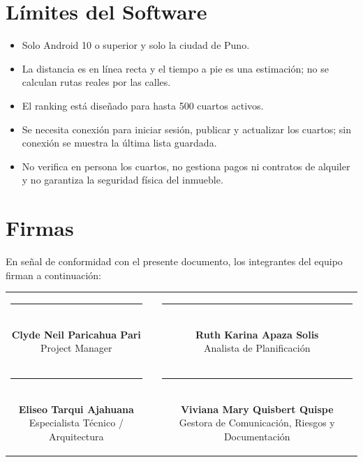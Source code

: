 \documentclass[11pt,a4paper]{article}
\begin{document}
\section{Límites del Software}
\begin{itemize}[leftmargin=*]
    \item Solo Android 10 o superior y solo la ciudad de Puno.
    \item La distancia es en línea recta y el tiempo a pie es una estimación; no se calculan rutas reales por las calles.
    \item El ranking está diseñado para hasta 500 cuartos activos.
    \item Se necesita conexión para iniciar sesión, publicar y actualizar los cuartos; sin conexión se muestra la última lista guardada.
    \item No verifica en persona los cuartos, no gestiona pagos ni contratos de alquiler y no garantiza la seguridad física del inmueble.
\end{itemize}

\section{Firmas}
\noindent En señal de conformidad con el presente documento, los integrantes del equipo firman a continuación:

\vspace{1.5cm}
\begin{center}
\begin{tabular}{c c c}
    \parbox{6.5cm}{\centering \rule{6.0cm}{0.6pt}\\[5pt] \textbf{Clyde Neil Paricahua Pari}\\[2pt] {\footnotesize Project Manager}}
    & \hspace{0.8cm} &
    \parbox{6.5cm}{\centering \rule{6.0cm}{0.6pt}\\[5pt] \textbf{Ruth Karina Apaza Solis}\\[2pt] {\footnotesize Analista de Planificación}}
    \\[2.0cm]
    \parbox{6.5cm}{\centering \rule{6.0cm}{0.6pt}\\[5pt] \textbf{Eliseo Tarqui Ajahuana}\\[2pt] {\footnotesize Especialista Técnico / Arquitectura}}
    & \hspace{0.8cm} &
    \parbox{6.5cm}{\centering \rule{6.0cm}{0.6pt}\\[5pt] \textbf{Viviana Mary Quisbert Quispe}\\[2pt] {\footnotesize Gestora de Comunicación, Riesgos y Documentación}}
\end{tabular}
\end{center}
\end{document}
